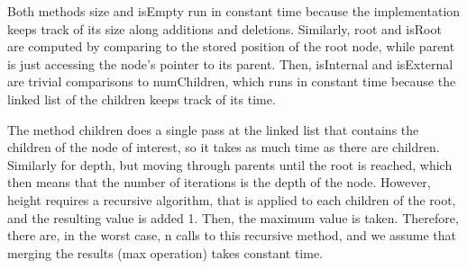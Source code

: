  

Both methods size and isEmpty run in constant time because the implementation keeps track of its size along additions and deletions.
Similarly, root and isRoot are computed by comparing to the stored position of the root node, while parent is just accessing the node's pointer to its parent.
Then, isInternal and isExternal are trivial comparisons to numChildren, which runs in constant time because the linked list of the children keeps track of its time.

The method children does a single pass at the linked list that contains the children of the node of interest, so it takes as much time as there are children.
Similarly for depth, but moving through parents until the root is reached, which then means that the number of iterations is the depth of the node.
However, height requires a recursive algorithm, that is applied to each children of the root, and the resulting value is added 1. Then, the maximum value is taken. Therefore, there are, in the worst case, n calls to this recursive method, and we assume that merging the results (max operation) takes constant time.


\begin{algorithm*}





\end{algorithm*}

